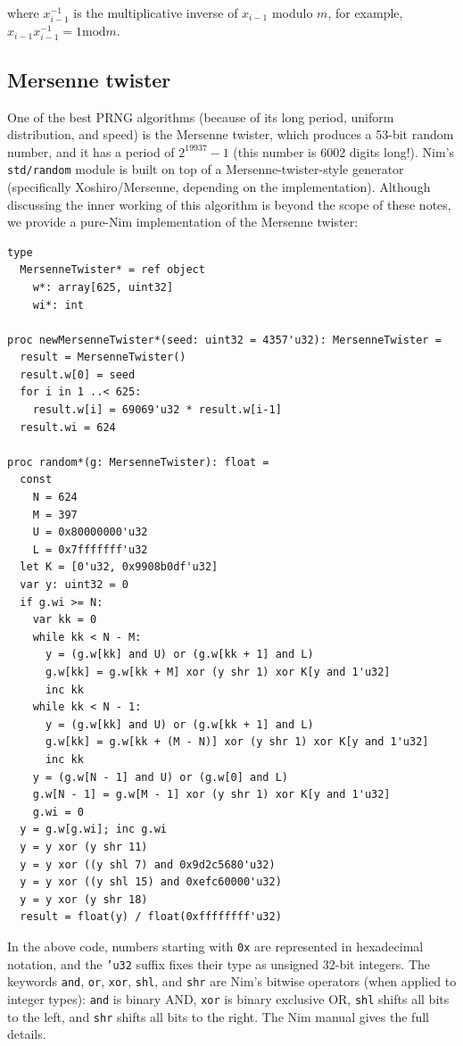 \documentclass[justified, sixbynine]{tufte-book}
\def\ft{\small\tt}
\theoremstyle{plain}%
\newtheorem * {corollary}{Corollary}
\theoremstyle{definition}
\theoremstyle{remark}
\newtheorem * {remark}{Remark}
\newtheorem * {note}{Note}
\begin{document}
\begin{fullwidth}
where $x_{i-1}^{-1}$ is the multiplicative inverse of $x_{i-1}$ modulo $m$,
for example, $x_{i-1}x_{i-1}^{-1}=1\textrm{mod}m$.

\goodbreak\subsection{Mersenne twister}

One of the best PRNG algorithms (because of its long period, uniform distribution, and speed) is the Mersenne twister, which produces a 53-bit random number,
and it has a period of $2^{19937}-1$ (this number is 6002 digits long!).
Nim's {\ft std/random} module is built on top of a Mersenne-twister-style generator (specifically Xoshiro/Mersenne, depending on the implementation).
Although discussing the inner working of this algorithm is beyond the scope of these notes, we provide a
pure-Nim implementation of the Mersenne twister:


\begin{lstlisting}[caption={in file: {\ft nlib/randomgen.nim}}]
type
  MersenneTwister* = ref object
    w*: array[625, uint32]
    wi*: int

proc newMersenneTwister*(seed: uint32 = 4357'u32): MersenneTwister =
  result = MersenneTwister()
  result.w[0] = seed
  for i in 1 ..< 625:
    result.w[i] = 69069'u32 * result.w[i-1]
  result.wi = 624

proc random*(g: MersenneTwister): float =
  const
    N = 624
    M = 397
    U = 0x80000000'u32
    L = 0x7fffffff'u32
  let K = [0'u32, 0x9908b0df'u32]
  var y: uint32 = 0
  if g.wi >= N:
    var kk = 0
    while kk < N - M:
      y = (g.w[kk] and U) or (g.w[kk + 1] and L)
      g.w[kk] = g.w[kk + M] xor (y shr 1) xor K[y and 1'u32]
      inc kk
    while kk < N - 1:
      y = (g.w[kk] and U) or (g.w[kk + 1] and L)
      g.w[kk] = g.w[kk + (M - N)] xor (y shr 1) xor K[y and 1'u32]
      inc kk
    y = (g.w[N - 1] and U) or (g.w[0] and L)
    g.w[N - 1] = g.w[M - 1] xor (y shr 1) xor K[y and 1'u32]
    g.wi = 0
  y = g.w[g.wi]; inc g.wi
  y = y xor (y shr 11)
  y = y xor ((y shl 7) and 0x9d2c5680'u32)
  y = y xor ((y shl 15) and 0xefc60000'u32)
  y = y xor (y shr 18)
  result = float(y) / float(0xffffffff'u32)
\end{lstlisting}

In the above code, numbers starting with \verb!0x! are represented in hexadecimal notation, and the {\ft 'u32} suffix fixes their type as unsigned 32-bit integers. The keywords {\ft and}, {\ft or}, {\ft xor}, {\ft shl}, and {\ft shr} are Nim's bitwise operators (when applied to integer types): {\ft and} is binary AND, {\ft xor} is binary exclusive OR, {\ft shl} shifts all bits to the left, and {\ft shr} shifts all bits to the right. The Nim manual gives the full details.


\end{fullwidth}
\end{document}

